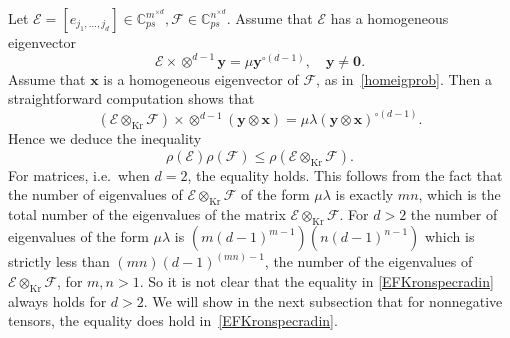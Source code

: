 \documentclass{amsart}
\newcommand{\C}{\mathbb{C}}
\newcommand{\x}{\mathbf{x}}
\newcommand{\y}{\mathbf{y}}
\newcommand{\0}{\mathbf{0}}
\newcommand{\1}{\mathbf{1}}
\newcommand{\cE}{\mathcal{E}}
\newcommand{\cF}{\mathcal{F}}
\newcommand{\Kron}{\mathop{\mathrm{Kr}}\nolimits}
\theoremstyle{remark}
\numberwithin{equation}{section} %
\renewcommand{\le}{\leqslant}
\begin{document}
 Let $\cE=[e_{j_1,\ldots,j_d}]\in \C^{m^{\times d}}_{ps},\cF\in \C^{n^{\times d}}_{ps}$.  Assume that $\cE$ has a homogeneous eigenvector
 \begin{equation}\label{Ehomeig}
 \cE\times\otimes^{d-1}\y=\mu \y^{\circ(d-1)}, \quad \y\neq \0.
 \end{equation}
 Assume that $\x$ is a homogeneous eigenvector of $\cF$, as in~\eqref{homeigprob}.  Then a straightforward computation shows that
 \begin{equation}\label{EFKronprdeig}
 (\cE\otimes_{\Kron}\cF)\times \otimes^{d-1}(\y\otimes\x)=\mu\lambda (\y\otimes\x)^{\circ(d-1)}.
 \end{equation}
 Hence we deduce the inequality
 \begin{equation}\label{EFKronspecradin}
 \rho(\cE)\rho(\cF)\le \rho(\cE\otimes_{\Kron}\cF).
 \end{equation}
 For matrices, i.e.\ when $d=2$, the equality holds.
%
This follows from the fact that
 the number of eigenvalues of $\cE\otimes_{\Kron}\cF$ of the form $\mu\lambda$ is exactly $mn$, which is the total number
 of the eigenvalues of the matrix $\cE\otimes_{\Kron}\cF$. For $d>2$ the number of eigenvalues of the form $\mu\lambda$
 is $(m(d-1)^{m-1})(n(d-1)^{n-1})$ which is strictly less than $(mn)(d-1)^{(mn)-1}$, the number of the eigenvalues of $\cE\otimes_{\Kron}\cF$,
 for $m,n>1$.  So it is not clear that the equality in \eqref{EFKronspecradin} always holds for $d>2$.
 We will show in the next subsection that for nonnegative tensors, the equality does hold in~\eqref{EFKronspecradin}.
\end{document}
